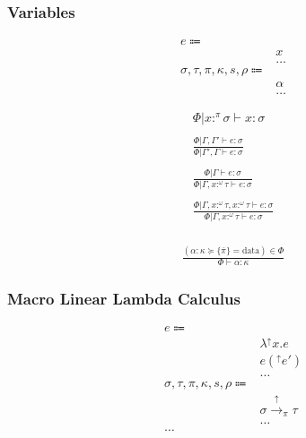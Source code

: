 \documentclass {article}
\begin{document}
\subsubsection{Variables}
\begin{align*}
e \Coloneqq & \\
& x \tag{Variable} \\
& \dots \\
\sigma, \tau, \pi, \kappa, s, \rho \Coloneqq & \\
& \alpha \tag{Type Variable} \\
& \dots
\end{align*}

\begin{gather*}
\Phi | x :^\pi \sigma \vdash x : \sigma \\
\\
\frac
{\Phi | \Gamma, \Gamma' \vdash e : \sigma}
{\Phi | \Gamma', \Gamma \vdash e : \sigma} \\
\\
\frac
{\Phi | \Gamma \vdash e : \sigma}
{\Phi | \Gamma, x :^\omega \tau \vdash e : \sigma } \\
\\
\frac
{\Phi | \Gamma, x :^\omega \tau, x :^\omega \tau \vdash e : \sigma}
{\Phi | \Gamma, x :^\omega \tau \vdash e : \sigma } \\
\end{gather*}

\begin{gather*}
\frac
{(\alpha : \kappa \succeq \{ \overline \pi \} = \text{data} ) \in \Phi}
{\Phi \vdash \alpha : \kappa}
\end{gather*}

\subsubsection{Macro Linear Lambda Calculus}
\begin{align*}
e \Coloneqq & \\
& \lambda^\uparrow x. e \tag{Macro Lambda}\\
& e(^\uparrow e') \tag{Macro Application}\\
& \dots \\
\sigma, \tau, \pi, \kappa, s, \rho \Coloneqq & \\
& \sigma \xrightarrow{\uparrow}_\pi \tau \tag{Macro} \\
& \dots \\
\dots
\end{align*}
\end{document}
